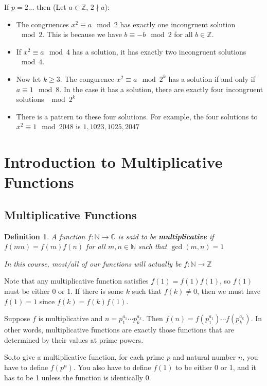 \documentclass[12pt,titlepage]{article}
\newtheorem{protodefinition}[prototheorem]{Definition}
\newenvironment{definition}
{\colorlet{shadecolor}{cyan!15}\begin{shaded}\begin{protodefinition}\normalfont}{\end{protodefinition}\end{shaded}}
\let\stdsection\section
\renewcommand\section{\clearpage\stdsection}
\begin{document}
If $p = 2$... then (Let $a \in \mathbb{Z}$, $2 \nmid a$): \begin{itemize}
\item The congruences $x^2 \equiv a \mod 2$ has exactly one incongruent solution $\mod 2$. This is because we have $b \equiv -b \mod 2$ for all $b \in \mathbb{Z}$. 
\item If $x^2 \equiv a \mod 4$ has a solution, it has exactly two incongruent solutions $\mod 4$. 
\item Now let $k \geq 3$. The congurence $x^2 \equiv a \mod 2^k$ has a solution if and only if $a \equiv 1 \mod 8$. In the case it has a solution, there are exactly four incongruent solutions $\mod 2^k$
\item There is a pattern to these four solutions. For example, the four solutions to $x^2 \equiv 1 \mod 2048$ is $1, 1023, 1025, 2047$
\end{itemize}

\section{Introduction to Multiplicative Functions}
\subsection{Multiplicative Functions}
\begin{definition}
	A function $f: \mathbb{N} \rightarrow \mathbb{C}$ is said to be \textbf{multiplicative} if $f(mn) = f(m)f(n)$ for all $m, n \in \mathbb{N}$ such that $\gcd(m,n) = 1$

	In this course, most/all of our functions will actually be $f: \mathbb{N} \rightarrow \mathbb{Z}$
\end{definition}

Note that any multiplicative function satisfies $f(1) = f(1)f(1)$, so $f(1)$ must be either 0 or 1. If there is some $k$ such that $f(k) \neq 0$, then we must have $f(1) = 1$ since $f(k) = f(k)f(1)$. 

Suppose $f$ is multiplicative and $n = p_1^{a_1}\cdots p_k^{a_k}$. Then $f(n) = f(p_1^{a_1}) \cdots f(p_k^{a_k})$. In other words, multiplicative functions are exactly those functions that are determined by their values at prime powers. 

So,to give a multiplicative function, for each prime $p$ and natural number $n$, you have to define $f(p^n)$. You also have to define $f(1)$ to be either 0 or 1, and it has to be 1 unless the function is identically 0. 
\end{document}

